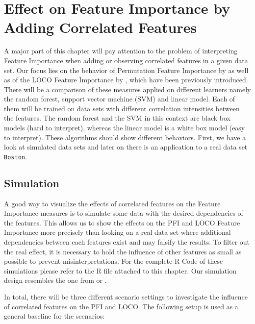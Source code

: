 \documentclass[]{krantz}
\begin{document}
\section{Effect on Feature Importance by Adding Correlated
Features}\label{effect-on-feature-importance-by-adding-correlated-features}

A major part of this chapter will pay attention to the problem of
interpreting Feature Importance when adding or observing correlated
features in a given data set. Our focus lies on the behavior of
Permutation Feature Importance by \citet{breiman2001random} as well as
of the LOCO Feature Importance by \citet{lei2018distribution}, which
have been previously introduced. There will be a comparison of these
measures applied on different learners namely the random forest, support
vector machine (SVM) and linear model. Each of them will be trained on
data sets with different correlation intensities between the features.
The random forest and the SVM in this context are black box models (hard
to interpret), whereas the linear model is a white box model (easy to
interpret). These algorithms should show different behaviors. First, we
have a look at simulated data sets and later on there is an application
to a real data set \texttt{Boston}.

\subsection{Simulation}\label{simulation}

A good way to visualize the effects of correlated features on the
Feature Importance measures is to simulate some data with the desired
dependencies of the features. This allows us to show the effects on the
PFI and LOCO Feature Importance more precisely than looking on a real
data set where additional dependencies between each features exist and
may falsify the results. To filter out the real effect, it is necessary
to hold the influence of other features as small as possible to prevent
misinterpretations. For the complete R Code of these simulations please
refer to the R file attached to this chapter. Our simulation design
resembles the one from \citet{strobl2008} or \citet{archer2008}.

In total, there will be three different scenario settings to investigate
the influence of correlated features on the PFI and LOCO. The following
setup is used as a general baseline for the scenarios:
\end{document}
